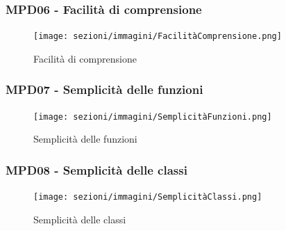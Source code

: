 \subsubsection{MPD06 - Facilità di comprensione}
\begin{figure}[!ht]
    \caption{Facilità di comprensione}
    \vspace{10px}
    \texttt{[image: sezioni/immagini/FacilitàComprensione.png]}
    \centering
\end{figure}
\pagebreak
\subsubsection{MPD07 - Semplicità delle funzioni}
\begin{figure}[!ht]
    \caption{Semplicità delle funzioni}
    \vspace{10px}
    \texttt{[image: sezioni/immagini/SemplicitàFunzioni.png]}
    \centering
\end{figure}
\subsubsection{MPD08 - Semplicità delle classi}
\begin{figure}[!ht]
    \caption{Semplicità delle classi}
    \vspace{10px}
    \texttt{[image: sezioni/immagini/SemplicitàClassi.png]}
    \centering
\end{figure}